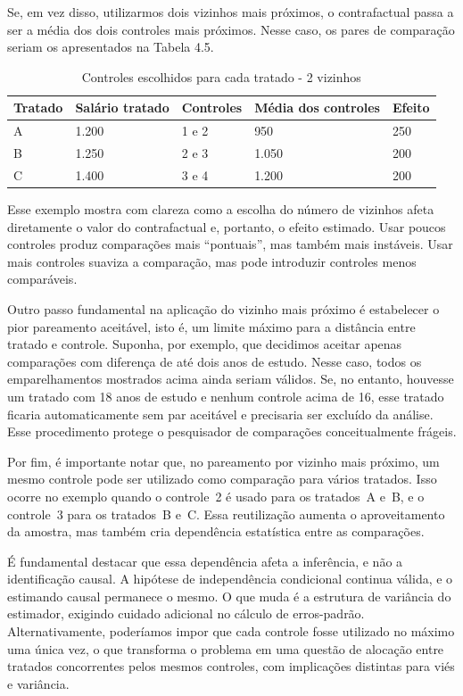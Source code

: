 Se, em vez disso, utilizarmos dois vizinhos mais próximos, o contrafactual passa a ser a média dos dois controles mais próximos. Nesse caso, os pares de comparação seriam os apresentados na Tabela 4.5.

\begin{table}[]
    \centering
    \begin{tabular}{lllll}
       Tratado  & Salário tratado & Controles & Média dos controles & Efeito \\\midrule
        A & 1.200 & 1 e 2 & 950 & 250\\
        B & 1.250 & 2 e 3 & 1.050 & 200\\
        C & 1.400 & 3 e 4 & 1.200 & 200\\\bottomrule
    \end{tabular}
    \caption{Controles escolhidos para cada tratado - 2 vizinhos}
    \label{tab:placeholder}
\end{table}

Esse exemplo mostra com clareza como a escolha do número de vizinhos afeta diretamente o valor do contrafactual e, portanto, o efeito estimado. Usar poucos controles produz comparações mais “pontuais”, mas também mais instáveis. Usar mais controles suaviza a comparação, mas pode introduzir controles menos comparáveis.

Outro passo fundamental na aplicação do vizinho mais próximo é estabelecer o pior pareamento aceitável, isto é, um limite máximo para a distância entre tratado e controle. Suponha, por exemplo, que decidimos aceitar apenas comparações com diferença de até dois anos de estudo. Nesse caso, todos os emparelhamentos mostrados acima ainda seriam válidos. Se, no entanto, houvesse um tratado com 18 anos de estudo e nenhum controle acima de 16, esse tratado ficaria automaticamente sem par aceitável e precisaria ser excluído da análise. Esse procedimento protege o pesquisador de comparações conceitualmente frágeis.

Por fim, é importante notar que, no pareamento por vizinho mais próximo, um mesmo controle pode ser utilizado como comparação para vários tratados. Isso ocorre no exemplo quando o controle~2 é usado para os tratados~A e~B, e o controle~3 para os tratados~B e~C. Essa reutilização aumenta o aproveitamento da amostra, mas também cria dependência estatística entre as comparações.

É fundamental destacar que essa dependência afeta a inferência, e não a identificação causal. A hipótese de independência condicional continua válida, e o estimando causal permanece o mesmo. O que muda é a estrutura de variância do estimador, exigindo cuidado adicional no cálculo de erros-padrão. Alternativamente, poderíamos impor que cada controle fosse utilizado no máximo uma única vez, o que transforma o problema em uma questão de alocação entre tratados concorrentes pelos mesmos controles, com implicações distintas para viés e variância.


